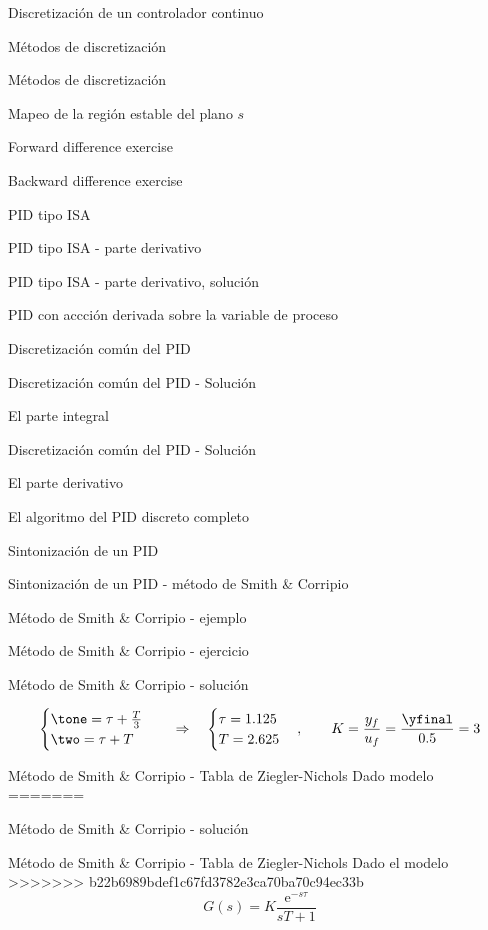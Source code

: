 \documentclass[presentation,aspectratio=1610]{beamer}
\begin{document}
\begin{frame}[label={sec:org86d23da}]{Discretización de un controlador continuo}
\begin{frame}[label={sec:org3ca2082}]{Métodos de discretización}
\begin{frame}[label={sec:orga78cff2}]{Métodos de discretización}
\begin{frame}[label={sec:org28bff53}]{Mapeo de la región estable del plano \(s\)}
\begin{frame}[label={sec:org9bb57fa}]{Forward difference exercise}
\begin{frame}[label={sec:orgaf8c1b0}]{Backward difference exercise}
\begin{frame}[label={sec:orgb2215e6}]{PID tipo ISA}
\begin{frame}[label={sec:orga06296a}]{PID tipo ISA - parte derivativo}
\begin{frame}[label={sec:org978e098}]{PID tipo ISA - parte derivativo, solución}
\begin{frame}[label={sec:orgf3b475b}]{PID con accción derivada sobre la variable de proceso}
\begin{frame}[label={sec:org5c3258e}]{Discretización común del PID}
\begin{frame}[label={sec:org95130b5}]{Discretización común del PID - Solución}
\begin{block}{El parte integral}
\begin{frame}[label={sec:org35f72c2}]{Discretización común del PID - Solución}
\begin{block}{El parte derivativo}
\begin{frame}[label={sec:org34749bc}]{El algoritmo del PID discreto completo}
\begin{frame}[label={sec:orgaefa60b}]{Sintonización de un PID}
\begin{frame}[label={sec:orge6db74e}]{Sintonización de un PID - método de Smith \& Corripio}
\begin{frame}[label={sec:org7d7b902}]{Método de Smith \& Corripio - ejemplo}
\begin{frame}[label={sec:org7c57aa3}]{Método de Smith \& Corripio - ejercicio}
\begin{frame}[label={sec:orgd1b31bc}]{Método de Smith \& Corripio - solución}
\begin{center}
\end{center}
\[ \begin{cases} \tone = \tau + \frac{T}{3}\\ \two = \tau + T \end{cases} \quad \Rightarrow \quad \begin{cases} \tau = 1.125 \\ T = 2.625 \end{cases}, \qquad  K = \frac{y_f}{u_f} = \frac{\yfinal}{\uampl} = \ggain \]
\end{frame}
\begin{frame}[label={sec:org5d33a76}]{Método de Smith \& Corripio - Tabla de Ziegler-Nichols}
Dado modelo 
=======
\begin{frame}[label={sec:org9a22f1d}]{Método de Smith \& Corripio - solución}
\end{frame}
\begin{frame}[label={sec:org5f70299}]{Método de Smith \& Corripio - Tabla de Ziegler-Nichols}
Dado el modelo 
>>>>>>> b22b6989bdef1c67fd3782e3ca70ba70c94ec33b
\[ G(s) = K \frac{\mathrm{e}^{-s\tau}}{sT + 1} \]

\end{frame}
\end{frame}
\end{frame}
\end{frame}
\end{frame}
\end{frame}
\end{frame}
\end{block}
\end{frame}
\end{block}
\end{frame}
\end{frame}
\end{frame}
\end{frame}
\end{frame}
\end{frame}
\end{frame}
\end{frame}
\end{frame}
\end{frame}
\end{frame}
\end{frame}
\end{document}
